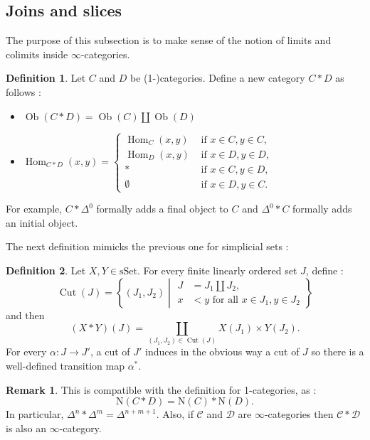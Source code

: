 \documentclass[11pt]{article}
\theoremstyle{definition}
\newtheorem{definition}{Definition}
\newtheorem{remark}{Remark}
\newcommand{\C}{\mathcal{C}}
\newcommand{\Cut}{\operatorname{Cut}}
\newcommand{\D}{\mathcal{D}}
\newcommand{\Hom}{\operatorname{Hom}}
\newcommand{\N}{\mathrm{N}}
\newcommand{\Ob}{\operatorname{Ob}}
\newcommand{\sSet}{\mathrm{sSet}}
\begin{document}
\subsection{Joins and slices}

The purpose of this subsection is to make sense of the notion of limits and colimits inside $\infty$-categories.

\begin{definition}
    Let $C$ and $D$ be (1-)categories. Define a new category $C \ast D$ as follows :
    \begin{itemize}
        \item $\Ob(C \ast D) = \Ob(C) \amalg \Ob(D)$
        \item $\Hom_{C \ast D}(x, y) = \left\{\begin{aligned}
            \Hom_C(x, y) &\text{ if }x \in C, y \in C,\\
            \Hom_D(x, y) &\text{ if }x \in D, y \in D,\\
            \ast &\text{ if }x \in C, y \in D,\\
            \emptyset &\text{ if }x \in D, y \in C.
        \end{aligned}\right.$
    \end{itemize}
\end{definition}
For example, $C \ast \Delta^0$ formally adds a final object to $C$ and $\Delta^0 \ast C$ formally adds an initial object.

The next definition mimicks the previous one for simplicial sets :
\begin{definition}
    Let $X, Y \in \sSet$. For every finite linearly ordered set $J$, define :
    \[
        \Cut(J) = \left\{(J_1, J_2) \middle| \begin{aligned}J &= J_1 \amalg J_2,\\x &< y \text{ for all }x \in J_1, y \in J_2\end{aligned}\right\}
    \]
    and then
    \[
        (X \ast Y)(J) = \coprod_{(J_1, J_2) \in \Cut(J)} X(J_1) \times Y(J_2).
    \]
    For every $\alpha : J \to J'$, a cut of $J'$ induces in the obvious way a cut of $J$ so there is a well-defined transition map $\alpha^*$.
\end{definition}

\begin{remark}
    This is compatible with the definition for 1-categories, as :
    \[
        \N(C \ast D) = \N(C) \ast \N(D).
    \]
    In particular, $\Delta^n \ast \Delta^m = \Delta^{n+m+1}$.
    Also, if $\C$ and $\D$ are $\infty$-categories then $\C \ast \D$ is also an $\infty$-category.
\end{remark}
\end{document}
